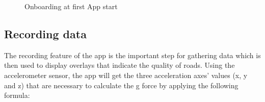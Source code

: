 \documentclass[10pt,a4paper]{article} %
\begin{document}
	\begin{figure}[H]
	  \centering
	  \hfill
	  \hfill
	  \caption{Onboarding at first App start}
	  \label{fig:onboarding}
	\end{figure}
	
	
    

    \subsection{Recording data}
    	The recording feature of the app is the important step for gathering data which is then used to display overlays that indicate the quality of roads.
    	Using the accelerometer sensor, the app will get the three acceleration axes' values (x, y and z) that are necessary to calculate the g force by applying the following formula:
\end{document}
